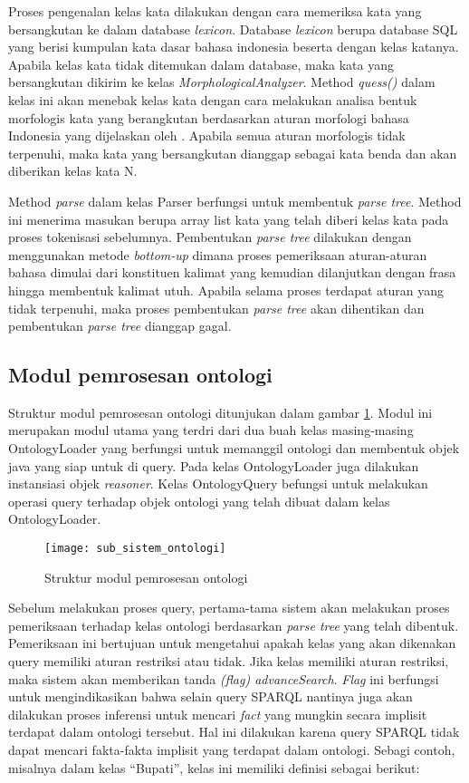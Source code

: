 Proses pengenalan kelas kata dilakukan dengan cara memeriksa kata yang bersangkutan ke dalam database \emph{lexicon}. Database \emph{lexicon} berupa database SQL yang berisi kumpulan kata dasar bahasa indonesia beserta dengan kelas katanya. Apabila kelas kata tidak ditemukan dalam database, maka kata yang bersangkutan dikirim ke kelas \emph{MorphologicalAnalyzer}. Method \emph{quess()} dalam kelas ini akan menebak kelas kata dengan cara melakukan analisa bentuk morfologis kata yang berangkutan berdasarkan aturan morfologi bahasa Indonesia yang dijelaskan oleh \citet{alwi}. Apabila semua aturan morfologis tidak terpenuhi, maka kata yang bersangkutan dianggap sebagai kata benda dan akan diberikan kelas kata N.

Method \emph{parse} dalam kelas Parser berfungsi untuk membentuk \emph{parse tree}. Method ini menerima masukan berupa array list kata yang telah diberi kelas kata pada proses tokenisasi sebelumnya. Pembentukan \emph{parse tree} dilakukan dengan menggunakan metode \emph{bottom-up} dimana proses pemeriksaan aturan-aturan bahasa dimulai dari konstituen kalimat yang kemudian dilanjutkan dengan frasa hingga membentuk kalimat utuh. Apabila selama proses terdapat aturan yang tidak terpenuhi, maka proses pembentukan \emph{parse tree} akan dihentikan dan pembentukan \emph{parse tree} dianggap gagal.

\subsection{Modul pemrosesan ontologi}
Struktur modul pemrosesan ontologi ditunjukan dalam gambar \ref{fig:sub_sistem_ontologi}. Modul ini merupakan modul utama yang terdri dari dua buah kelas masing-masing OntologyLoader yang berfungsi untuk memanggil ontologi dan membentuk objek java yang siap untuk di query. Pada kelas OntologyLoader juga dilakukan instansiasi objek \emph{reasoner}. Kelas OntologyQuery befungsi untuk melakukan operasi query terhadap objek ontologi yang telah dibuat dalam kelas OntologyLoader.

\begin{figure}[ht]
    \centering
    \texttt{[image: sub\_sistem\_ontologi]}
    \caption{Struktur modul pemrosesan ontologi} 
    \label{fig:sub_sistem_ontologi}
\end{figure}

Sebelum melakukan proses query, pertama-tama sistem akan melakukan proses pemeriksaan terhadap kelas ontologi berdasarkan \emph{parse tree} yang telah dibentuk. Pemeriksaan ini bertujuan untuk mengetahui apakah kelas yang akan dikenakan query memiliki aturan restriksi atau tidak. Jika kelas memiliki aturan restriksi, maka sistem akan memberikan tanda \emph{(flag) advanceSearch}. \emph{Flag} ini berfungsi untuk mengindikasikan bahwa selain query SPARQL nantinya juga akan dilakukan proses inferensi untuk mencari \emph{fact} yang mungkin secara implisit terdapat dalam ontologi tersebut. Hal ini dilakukan karena query SPARQL tidak dapat mencari fakta-fakta implisit yang terdapat dalam ontologi. Sebagi contoh, misalnya dalam kelas ``Bupati'', kelas ini memiliki definisi sebagai berikut:

